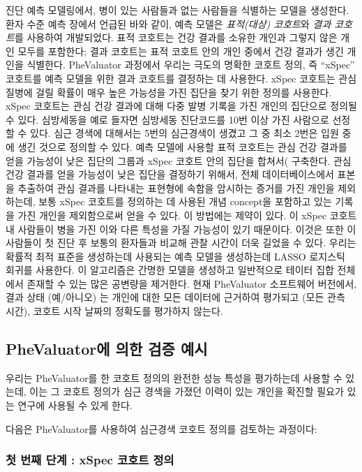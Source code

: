 \documentclass[10.5pt]{book}
\theoremstyle{definition}
\theoremstyle{definition}
\theoremstyle{definition}
\theoremstyle{remark}
\begin{document}
진단 예측 모델링에서, 병이 있는 사람들과 없는 사람들을 식별하는 모델을
생성한다. 환자 수준 예측 장에서 언급된 바와 같이, 예측 모델은
\emph{표적(대상) 코호트}와 \emph{결과 코호트}를 사용하여 개발되었다.
표적 코호트는 건강 결과를 소유한 개인과 그렇지 않은 개인 모두를
포함한다; 결과 코호트는 표적 코호트 안의 개인 중에서 건강 결과가 생긴
개인을 식별한다. PheValuator 과정에서 우리는 극도의 명확한 코호트 정의,
즉 ``xSpec'' 코호트를 예측 모델을 위한 결과 코호트를 결정하는 데
사용한다. xSpec 코호트는 관심 질병에 걸릴 확률이 매우 높은 가능성을 가진
집단을 찾기 위한 정의를 사용한다. xSpec 코호트는 관심 건강 결과에 대해
다중 발병 기록을 가진 개인의 집단으로 정의될 수 있다. 심방세동을 예로
들자면 심방세동 진단코드를 10번 이상 가진 사람으로 선정할 수 있다. 심근
경색에 대해서는 5번의 심근경색이 생겼고 그 중 최소 2번은 입원 중에 생긴
것으로 정의할 수 있다. 예측 모델에 사용할 표적 코호트는 관심 건강 결과를
얻을 가능성이 낮은 집단의 그룹과 xSpec 코호트 안의 집단을 합쳐서(
구축한다. 관심 건강 결과를 얻을 가능성이 낮은 집단을 결정하기 위해서,
전체 데이터베이스에서 표본을 추출하여 관심 결과를 나타내는 표현형에
속함을 암시하는 증거를 가진 개인을 제외하는데, 보통 xSpec 코호트를
정의하는 데 사용된 개념 concept을 포함하고 있는 기록을 가진 개인을
제외함으로써 얻을 수 있다. 이 방법에는 제약이 있다. 이 xSpec 코호트 내
사람들이 병을 가진 이와 다른 특성을 가질 가능성이 있기 때문이다. 이것은
또한 이 사람들이 첫 진단 후 보통의 환자들과 비교해 관찰 시간이 더욱
길었을 수 있다. 우리는 확률적 최적 표준을 생성하는데 사용되는 예측
모델을 생성하는데 LASSO 로지스틱 회귀를 사용한다. \citep{suchard_2013}
이 알고리즘은 간명한 모델을 생성하고 일반적으로 테이터 집합 전체에서
존재할 수 있는 많은 공변량을 제거한다. 현재 PheValuator 소프트웨어
버전에서, 결과 상태 (예/아니오) 는 개인에 대한 모든 데이터에 근거하여
평가되고 (모든 관측 시간), 코호트 시작 날짜의 정확도를 평가하지 않는다.

\subsection{PheValuator에 의한 검증 예시}\label{phevaluator---}

우리는 PheValuator를 한 코호트 정의의 완전한 성능 특성을 평가하는데
사용할 수 있는데, 이는 그 코호트 정의가 심근 경색을 가졌던 이력이 있는
개인을 확진할 필요가 있는 연구에 사용될 수 있게 한다.

다음은 PheValuator를 사용하여 심근경색 코호트 정의를 검토하는 과정이다:

\subsubsection*{첫 번째 단계 : xSpec 코호트 정의}\label{---xspec--}
\end{document}
